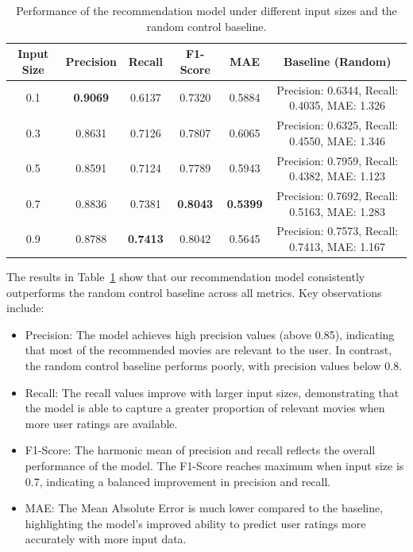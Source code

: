 \documentclass{article}
\begin{document}
\begin{table}[H]
    \centering
    \caption{Performance of the recommendation model under different input sizes and the random control baseline.}
    \label{tab:results}
    \begin{tabular}{cccccc}
        \toprule
        \textbf{Input Size} & \textbf{Precision} & \textbf{Recall} & \textbf{F1-Score} & \textbf{MAE}    & \textbf{Baseline (Random)}                    \\
        \midrule
        0.1                 & \textbf{0.9069}    & 0.6137          & 0.7320            & 0.5884          & Precision: 0.6344, Recall: 0.4035, MAE: 1.326 \\
        0.3                 & 0.8631             & 0.7126          & 0.7807            & 0.6065          & Precision: 0.6325, Recall: 0.4550, MAE: 1.346 \\
        0.5                 & 0.8591             & 0.7124          & 0.7789            & 0.5943          & Precision: 0.7959, Recall: 0.4382, MAE: 1.123 \\
        0.7                 & 0.8836             & 0.7381          & \textbf{0.8043}   & \textbf{0.5399} & Precision: 0.7692, Recall: 0.5163, MAE: 1.283 \\
        0.9                 & 0.8788             & \textbf{0.7413} & 0.8042            & 0.5645          & Precision: 0.7573, Recall: 0.7413, MAE: 1.167 \\
        \bottomrule
    \end{tabular}
\end{table}

The results in Table~\ref{tab:results} show that our recommendation model consistently outperforms the random control baseline across all metrics. Key observations include:

\begin{itemize}
    \item Precision: The model achieves high precision values (above 0.85), indicating that most of the recommended movies are relevant to the user. In contrast, the random control baseline performs poorly, with precision values below 0.8.

    \item Recall: The recall values improve with larger input sizes, demonstrating that the model is able to capture a greater proportion of relevant movies when more user ratings are available.

    \item F1-Score: The harmonic mean of precision and recall reflects the overall performance of the model. The F1-Score reaches maximum when input size is 0.7, indicating a balanced improvement in precision and recall.

    \item MAE: The Mean Absolute Error is much lower compared to the baseline, highlighting the model's improved ability to predict user ratings more accurately with more input data.

\end{itemize}
\end{document}
